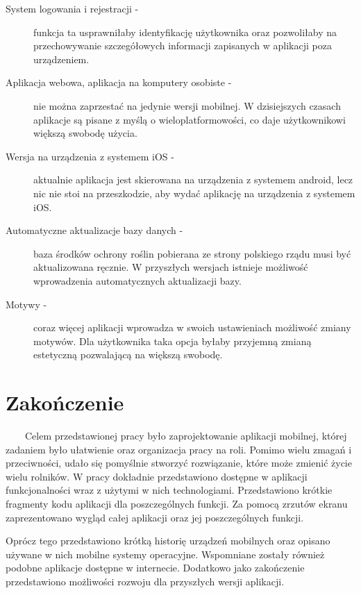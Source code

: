 \documentclass[a4paper,12pt,oneside]{book}
\begin{document}
	\begin{description}
		\item[System logowania i rejestracji -] funkcja ta usprawniłaby identyfikację użytkownika oraz pozwoliłaby na przechowywanie szczegółowych informacji zapisanych w aplikacji poza urządzeniem.
		\item[Aplikacja webowa, aplikacja na komputery osobiste -] nie można zaprzestać na jedynie wersji mobilnej. W dzisiejszych czasach aplikacje są pisane z myślą o wieloplatformowości, co daje użytkownikowi większą swobodę użycia.
		\item[Wersja na urządzenia z systemem iOS -] aktualnie aplikacja jest skierowana na urządzenia z systemem android, lecz nic nie stoi na przeszkodzie, aby wydać aplikację na urządzenia z systemem iOS.
		\item[Automatyczne aktualizacje bazy danych -] baza środków ochrony roślin pobierana ze strony polskiego rządu musi być aktualizowana ręcznie. W przyszłych wersjach istnieje możliwość wprowadzenia automatycznych aktualizacji bazy.
		\item[Motywy -] coraz więcej aplikacji wprowadza w swoich ustawieniach możliwość zmiany motywów. Dla użytkownika taka opcja byłaby przyjemną zmianą estetyczną pozwalającą na większą swobodę.
	\end{description}
	
	
	\section{Zakończenie}
	\ \ \ \
	Celem przedstawionej pracy było zaprojektowanie aplikacji mobilnej, której zadaniem było ułatwienie oraz organizacja pracy na roli. Pomimo wielu zmagań i przeciwności, udało się pomyślnie stworzyć rozwiązanie, które może zmienić życie wielu rolników. W pracy dokładnie przedstawiono dostępne w aplikacji funkcjonalności wraz z użytymi w nich technologiami. Przedstawiono krótkie fragmenty kodu aplikacji dla poszczególnych funkcji. Za pomocą zrzutów ekranu zaprezentowano wygląd całej aplikacji oraz jej poszczególnych funkcji. 
	
	Oprócz tego przedstawiono krótką historię urządzeń mobilnych oraz opisano używane w nich mobilne systemy operacyjne. Wspomniane zostały również podobne aplikacje dostępne w internecie. Dodatkowo jako zakończenie przedstawiono możliwości rozwoju dla przyszłych wersji aplikacji.
	
	\newpage
	
	
	
	
	\lstlistoflistings
	
	\listoffigures
	
\end{document}
